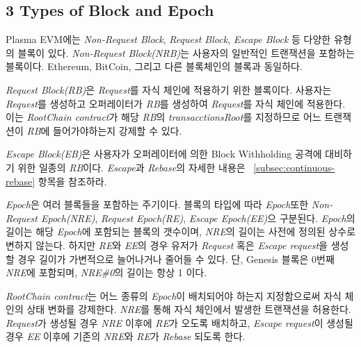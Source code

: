\documentclass[letterpaper, 11pt]{article}
\begin{document}
\subsection{3 Types of Block and Epoch}
\begin{CJK}{UTF8}{mj}
Plasma EVM에는 \emph{Non-Request Block}, \emph{Request Block}, \emph{Escape Block} 등 다양한 유형의 블록이 있다. \emph{Non-Request Block(NRB)}는 사용자의 일반적인 트랜잭션을 포함하는 블록이다. Ethereum, BitCoin, 그리고 다른 블록체인의 블록과 동일하다.

\emph{Request Block(RB)}은 \emph{Request}를 자식 체인에 적용하기 위한 블록이다. 사용자는 \emph{Request}를 생성하고 오퍼레이터가 \emph{RB}를 생성하여 \emph{Request}를 자식 체인에 적용한다. 이는 \emph{RootChain contract}가 해당 \emph{RB}의 \emph{transacctionsRoot}를 지정하므로 어느 트랜잭션이 \emph{RB}에 들어가야하는지 강제할 수 있다.

\emph{Escape Block(EB)}은 사용자가 오퍼레이터에 의한 Block Withholding 공격에 대비하기 위한 일종의 \emph{RB}이다. \emph{Escape}과 \emph{Rebase}의 자세한 내용은 ~\ref{subsec:continuous-rebase} 항목을 참조하라.

\bigskip

\emph{Epoch}은 여러 블록들을 포함하는 주기이다. 블록의 타입에 따라 \emph{Epoch}또한 \emph{Non-Request Epoch(NRE)}, \emph{Request Epoch(RE)}, \emph{Escape Epoch(EE)}으 구분된다. \emph{Epoch}의 길이는 해당 \emph{Epoch}에 포함되는 블록의 갯수이며, \emph{NRE}의 길이는 사전에 정의된 상수로 변하지 않는다. 하지만 \emph{RE}와 \emph{EE}의 경우 유저가 \emph{Request} 혹은 \emph{Escape request}을 생성할 경우 길이가 가변적으로 늘어나거나 줄어들 수 있다. 단, Genesis 블록은 0번째 \emph{NRE}에 포함되며, \emph{NRE\#0}의 길이는 항상 1 이다.

\emph{RootChain contract}는 어느 종류의 \emph{Epoch}이 배치되어야 하는지 지정함으로써 자식 체인의 상태 변화를 강제한다. \emph{NRE}를 통해 자식 체인에서 발생한 트랜잭션을 허용한다. \emph{Request}가 생성될 경우 \emph{NRE} 이후에 \emph{RE}가 오도록 배치하고, \emph{Escape request}이 생성될 경우 \emph{EE} 이후에 기존의 \emph{NRE}와 \emph{RE}가 \emph{Rebase} 되도록 한다.

\end{CJK}
\end{document}
